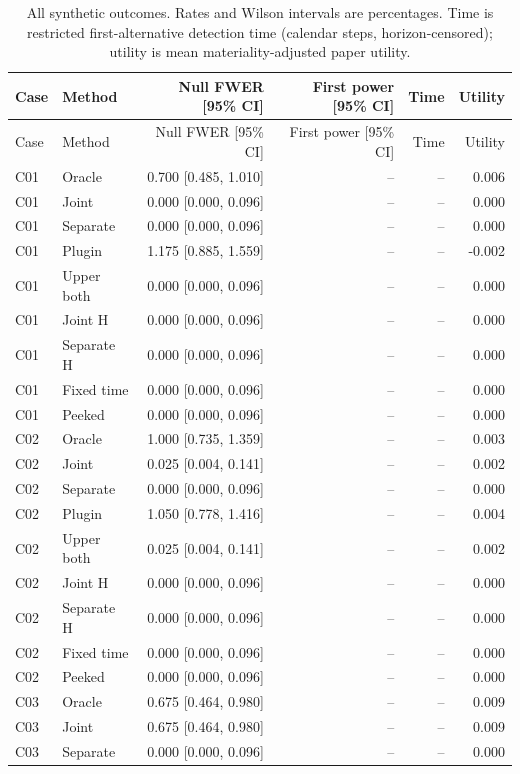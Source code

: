 \begingroup\scriptsize
\begin{longtable}{llrrrr}
\caption{All synthetic outcomes. Rates and Wilson intervals are percentages. Time is restricted first-alternative detection time (calendar steps, horizon-censored); utility is mean materiality-adjusted paper utility.}\\
\toprule Case & Method & Null FWER [95\% CI] & First power [95\% CI] & Time & Utility\\\midrule\endfirsthead
\toprule Case & Method & Null FWER [95\% CI] & First power [95\% CI] & Time & Utility\\\midrule\endhead
C01 & Oracle & 0.700 [0.485, 1.010] & -- & -- & 0.006\\
C01 & Joint & 0.000 [0.000, 0.096] & -- & -- & 0.000\\
C01 & Separate & 0.000 [0.000, 0.096] & -- & -- & 0.000\\
C01 & Plugin & 1.175 [0.885, 1.559] & -- & -- & -0.002\\
C01 & Upper both & 0.000 [0.000, 0.096] & -- & -- & 0.000\\
C01 & Joint H & 0.000 [0.000, 0.096] & -- & -- & 0.000\\
C01 & Separate H & 0.000 [0.000, 0.096] & -- & -- & 0.000\\
C01 & Fixed time & 0.000 [0.000, 0.096] & -- & -- & 0.000\\
C01 & Peeked & 0.000 [0.000, 0.096] & -- & -- & 0.000\\
C02 & Oracle & 1.000 [0.735, 1.359] & -- & -- & 0.003\\
C02 & Joint & 0.025 [0.004, 0.141] & -- & -- & 0.002\\
C02 & Separate & 0.000 [0.000, 0.096] & -- & -- & 0.000\\
C02 & Plugin & 1.050 [0.778, 1.416] & -- & -- & 0.004\\
C02 & Upper both & 0.025 [0.004, 0.141] & -- & -- & 0.002\\
C02 & Joint H & 0.000 [0.000, 0.096] & -- & -- & 0.000\\
C02 & Separate H & 0.000 [0.000, 0.096] & -- & -- & 0.000\\
C02 & Fixed time & 0.000 [0.000, 0.096] & -- & -- & 0.000\\
C02 & Peeked & 0.000 [0.000, 0.096] & -- & -- & 0.000\\
C03 & Oracle & 0.675 [0.464, 0.980] & -- & -- & 0.009\\
C03 & Joint & 0.675 [0.464, 0.980] & -- & -- & 0.009\\
C03 & Separate & 0.000 [0.000, 0.096] & -- & -- & 0.000\\

\end{longtable}
